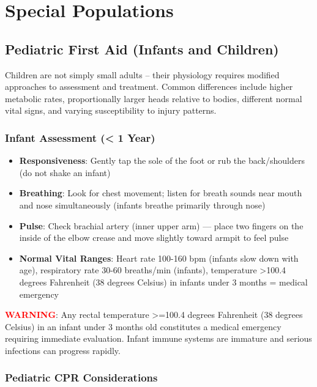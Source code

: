 \chapter{Special Populations}\label{ch:special}

\section{Pediatric First Aid (Infants and Children)}

Children are not simply small adults -- their physiology requires modified approaches to assessment and treatment. Common differences include higher metabolic rates, proportionally larger heads relative to bodies, different normal vital signs, and varying susceptibility to injury patterns.

\subsection{Infant Assessment (< 1 Year)}

\begin{itemize}[leftmargin=*]
  \item \textbf{Responsiveness}: Gently tap the sole of the foot or rub the back/shoulders (do not shake an infant)
  \item \textbf{Breathing}: Look for chest movement; listen for breath sounds near mouth and nose simultaneously (infants breathe primarily through nose)
  \item \textbf{Pulse}: Check brachial artery (inner upper arm) — place two fingers on the inside of the elbow crease and move slightly toward armpit to feel pulse
  \item \textbf{Normal Vital Ranges}: Heart rate 100-160 bpm (infants slow down with age), respiratory rate 30-60 breaths/min (infants), temperature >100.4 degrees Fahrenheit (38 degrees Celsius) in infants under 3 months = medical emergency
\end{itemize}

\noindent\textbf{\textcolor{red}{WARNING}}: Any rectal temperature >=100.4 degrees Fahrenheit (38 degrees Celsius) in an infant under 3 months old constitutes a medical emergency requiring immediate evaluation. Infant immune systems are immature and serious infections can progress rapidly.

\subsection{Pediatric CPR Considerations}


